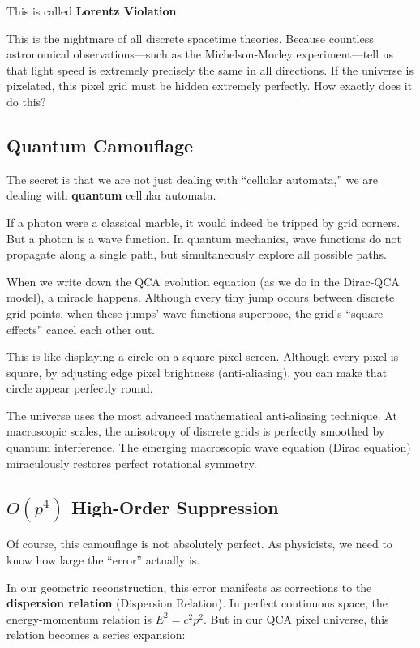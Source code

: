 \documentclass[11pt,a4paper,twoside]{book}
\begin{document}
This is called \textbf{Lorentz Violation}.

This is the nightmare of all discrete spacetime theories. Because countless astronomical observations---such as the Michelson-Morley experiment---tell us that light speed is extremely precisely the same in all directions. If the universe is pixelated, this pixel grid must be hidden extremely perfectly. How exactly does it do this?

\subsection{Quantum Camouflage}

The secret is that we are not just dealing with ``cellular automata,'' we are dealing with \textbf{quantum} cellular automata.

If a photon were a classical marble, it would indeed be tripped by grid corners. But a photon is a wave function. In quantum mechanics, wave functions do not propagate along a single path, but simultaneously explore all possible paths.

When we write down the QCA evolution equation (as we do in the Dirac-QCA model), a miracle happens. Although every tiny jump occurs between discrete grid points, when these jumps' wave functions superpose, the grid's ``square effects'' cancel each other out.

This is like displaying a circle on a square pixel screen. Although every pixel is square, by adjusting edge pixel brightness (anti-aliasing), you can make that circle appear perfectly round.

The universe uses the most advanced mathematical anti-aliasing technique. At macroscopic scales, the anisotropy of discrete grids is perfectly smoothed by quantum interference. The emerging macroscopic wave equation (Dirac equation) miraculously restores perfect rotational symmetry.

\subsection{$O(p^4)$ High-Order Suppression}

Of course, this camouflage is not absolutely perfect. As physicists, we need to know how large the ``error'' actually is.

In our geometric reconstruction, this error manifests as corrections to the \textbf{dispersion relation} (Dispersion Relation). In perfect continuous space, the energy-momentum relation is $E^2 = c^2p^2$. But in our QCA pixel universe, this relation becomes a series expansion:
\end{document}
